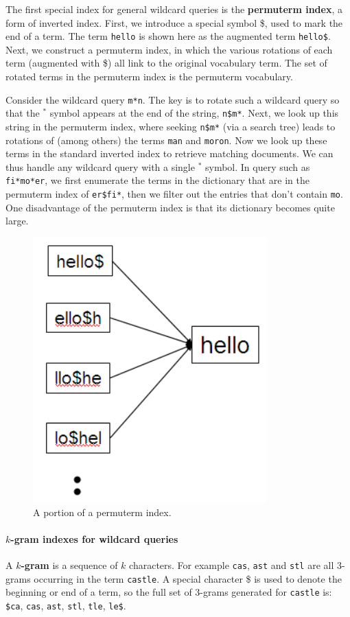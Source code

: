 \documentclass[letterpaper,11pt]{article}
\newcommand{\code}[1]{\texttt{#1}}
\begin{document}
The first special index for general wildcard queries is the \textbf{permuterm index}, a form of inverted index. First, we introduce a special symbol \$, used to mark the end of a term. The term \code{hello} is shown here as the augmented term \code{hello\$}. Next, we construct a permuterm index, in which the various rotations of each term (augmented with \$) all link to the original vocabulary term. The set of rotated terms in the permuterm index is the permuterm vocabulary.

Consider the wildcard query \code{m*n}. The key is to rotate such a wildcard query so that the $^*$ symbol appears at the end of the string, \code{n\$m*}. Next, we look up this string in the permuterm index, where seeking \code{n\$m*} (via a search tree) leads to rotations of (among others) the terms \code{man} and \code{moron}. Now we look up these terms in the standard inverted index to retrieve matching documents. We can thus handle any wildcard query with a single $^*$ symbol. In query such as \code{fi*mo*er}, we first enumerate the terms in the dictionary that are in the permuterm index of \code{er\$fi*}, then we filter out the entries that don't contain \code{mo}. One disadvantage of the permuterm index is that its dictionary becomes quite large.
\begin{figure}[H]
    \centering
    \includegraphics[scale=0.55]{sect3/figure_3_3.png}
    \caption{A portion of a permuterm index.}
\end{figure}

\paragraph{$k$-gram indexes for wildcard queries}
A \textbf{$k$-gram} is a sequence of $k$ characters. For example \code{cas}, \code{ast} and \code{stl} are all 3-grams occurring in the term \code{castle}. A special character \$ is used to denote the beginning or end of a term, so the full set of 3-grams generated for \code{castle} is: \code{\$ca}, \code{cas}, \code{ast}, \code{stl}, \code{tle}, \code{le\$}.
\end{document}
